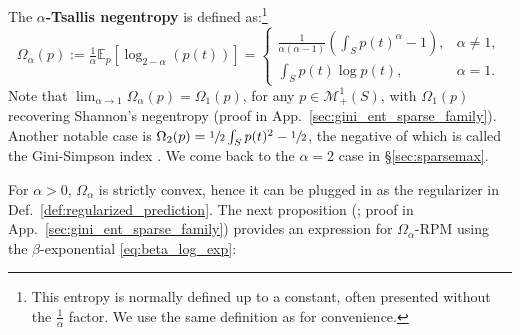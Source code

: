 \documentclass{article}
\newcommand{\remove}[1]{}
\begin{document}
The {\bf $\alpha$-Tsallis negentropy}  \citep{havrda1967quantification,Tsallis1988} is defined as:\footnote{This entropy is normally defined up to a constant, often presented without the $\tfrac{1}{\alpha}$ factor. We use the same definition as \citet[\S 4.3]{blondel2020learning} for convenience.} \begin{equation}\label{eq:tsallis}
\Omega_{\alpha}(p) := \tfrac{1}{\alpha} \mathbb{E}_{p}[\log_{2-\alpha}(p(t))] = 
\begin{cases}
\frac{1}{\alpha(\alpha-1)}\left( \int_S  p(t)^\alpha - 1 \right), &
\alpha \ne 1,\\
\int_S p(t) \log p(t), &
\alpha = 1.
\end{cases}
\end{equation}
Note that $\lim_{\alpha \rightarrow
1}\Omega_{\alpha}(p) = \Omega_{1}(p)$, for any $p \in \mathcal{M}_+^1(S)$, 
with $\Omega_{1}(p)$ recovering Shannon's negentropy (proof in App.~\ref{sec:gini_ent_sparse_family}). 
Another notable case is $\Omega_2(p) = \sfrac{1}{2}\int_S p(t)^2  - \sfrac{1}{2}$,
the negative of which is called the Gini-Simpson index \citep{Jost2006,Rao1982}. 
We come back to the $\alpha=2$ case in \S\ref{sec:sparsemax}.

\remove{
This family is continuous in $\alpha$, \textit{i.e.}, $\lim_{\alpha \rightarrow
1}\Omega_{\alpha}(p) = \Omega_{1}(p)$, for any $p \in \mathcal{M}_+^1(S)$, with $\Omega_{1}(p)$ recovering Shannon's negentropy (proof in App.~\ref{sec:gini_ent_sparse_family}). 
Another notable case is $\Omega_2(p) = \sfrac{1}{2}\int_S p(t)^2  - \sfrac{1}{2}$,
the negative of which has several names, {\it e.g.}, Gini-Simpson index \citep{Jost2006} or Rao's quadratic entropy \citep{Rao1982}. 
We will come back to the $\alpha=2$ case in \S\ref{sec:sparsemax}.
}

For $\alpha>0$, $\Omega_\alpha$ is strictly convex, hence it can be plugged in as the regularizer in  Def.~\ref{def:regularized_prediction}. 
The next proposition (\citep{naudts2009q}; proof in  App.~\ref{sec:gini_ent_sparse_family}) provides an expression for $\Omega_{\alpha}$-RPM using the $\beta$-exponential  \eqref{eq:beta_log_exp}: 





\begin{comment}
\vspace{0.15cm}
\begin{proposition}\label{prop:solution_rpm_tsallis}
For $\alpha > 0$ and $f\in\mathcal{F}$, 
\begin{equation}\label{eq:entmax}
\hat{p}_{\Omega_\alpha}[f](t) =  [(\alpha - 1)(f(t) - \lambda)]_+^{1/(\alpha - 1)},
\end{equation}
where $\lambda$ is a coefficient that ensures normalization.
\end{proposition}
\end{comment}
\end{document}
